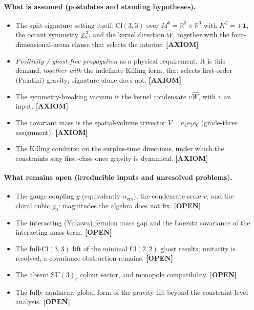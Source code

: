 \documentclass[11pt,oneside]{book}
\newcommand{\Wh}{\hat{W}}                         %
\newcommand{\Cl}{\mathrm{Cl}}                     %
\newcommand{\Zt}{\mathbb{Z}_2}
\newcommand{\RR}{\mathbb{R}}
\newcommand{\status}[1]{{\sffamily\bfseries\color{statuscol}[#1]}}
\theoremstyle{plain}
\theoremstyle{definition}
\theoremstyle{remark}
\begin{document}
{\paragraph{What is assumed (postulates and standing hypotheses).}
\begin{itemize}\setlength{\itemsep}{1pt}\setlength{\parskip}{0pt}
\item The split-signature setting itself: $\Cl(3,3)$ over $M^6=\RR^3\times\RR^3$
  with $K^2=+\mathbf 1$, the octant symmetry $\Zt^{\,3}$, and the kernel direction
  $\Wh$, together with the four-dimensional-arena clause that selects the interior.
  \status{AXIOM}
\item \emph{Positivity / ghost-free propagation} as a physical requirement. It is
  this demand, \emph{together with} the indefinite Killing form, that selects
  first-order (Palatini) gravity; signature alone does not. \status{AXIOM}
\item The symmetry-breaking vacuum is the kernel condensate $v\Wh$, with $v$ an
  input. \status{AXIOM}
\item The covariant mass is the spatial-volume trivector $V=e_4e_5e_6$
  (grade-three assignment). \status{AXIOM}
\item The Killing condition on the surplus-time directions, under which the
  constraints stay first-class once gravity is dynamical. \status{AXIOM}
\end{itemize}

\paragraph{What remains open (irreducible inputs and unresolved problems).}
\begin{itemize}\setlength{\itemsep}{1pt}\setlength{\parskip}{0pt}
\item The gauge coupling $g$ (equivalently $\alpha_{\mathrm{em}}$), the condensate
  scale $v$, and the chiral cubic $g_3$: magnitudes the algebra does not fix.
  \status{OPEN}
\item The interacting (Yukawa) fermion mass gap and the Lorentz covariance of the
  interacting mass term. \status{OPEN}
\item The full-$\Cl(3,3)$ lift of the minimal $\Cl(2,2)$ ghost results; unitarity
  is resolved, a covariance obstruction remains. \status{OPEN}
\item The absent $\mathrm{SU}(3)_c$ colour sector, and monopole compatibility.
  \status{OPEN}
\item The fully nonlinear, global form of the gravity lift beyond the
  constraint-level analysis. \status{OPEN}
\end{itemize}
}
\end{document}
